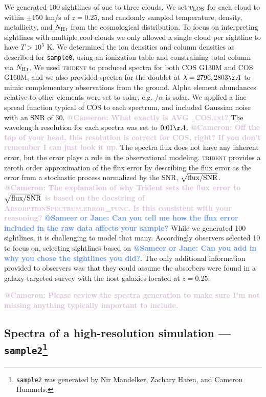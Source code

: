 \documentclass[fleqn,usenatbib]{mnras}
\makeatletter
\newcommand{\atsameer}[1]{\textcolor{CornflowerBlue}{\textbf{@Sameer or Jane: #1}}}
\newcommand{\atcameron}[1]{\textcolor{Thistle}{\textbf{@Cameron: #1}}}
\makeatother
\begin{document}
We generated 100 sightlines of one to three clouds.
We set $v_{\rm LOS}$ for each cloud to within $\pm150$ km/s of $z=0.25$, and randomly sampled temperature, density, metallicity, and $N_{\ion{H}{I}}$ from the cosmological distribution.
To focus on interpreting sightlines with multiple cool clouds we only allowed a single cloud per sightline to have $T>10^5$ K.
We determined the ion densities and column densities as described for \texttt{sample0}, using an ionization table and constraining total column via $N_{\ion{H}{I}}$.
We used \textsc{trident} to produced spectra for both COS G130M and COS G160M, and we also provided spectra for the  doublet at $\lambda = 2796, 2803 \AA$ to mimic complementary observations from the ground.
Alpha element abundances relative to other elements were set to solar, e.g. /$\alpha$ is solar.
We applied a line spread function typical of COS to each spectrum, and included Gaussian noise with an SNR of 30.
\atcameron{What exactly is AVG\_COS.txt?}
The wavelength resolution for each spectra was set to $0.01 \AA$.
\atcameron{Off the top of your head, this resolution is correct for COS, right?
If you don't remember I can just look it up.}
The spectra flux does not have any inherent error, but the error plays a role in the observational modeling.
\textsc{trident} provides a zeroth order approximation of the flux error by describing the flux error as the error from a stochastic process normalized by the SNR, $\sqrt{{\rm flux}/{\rm SNR}}$.
\atcameron{The explanation of why Trident sets the flux error to $\sqrt{{\rm flux}/{\rm SNR}}$ is based on the docstring of \textsc{AbsorptionSpectrum.error\_func}.
Is this consistent with your reasoning?}
\atsameer{Can you tell me how the flux error included in the raw data affects your sample?}
While we generated 100 sightlines, it is challenging to model that many.
Accordingly observers selected 10 to focus on, selecting sightlines based on \atsameer{Can you add in why you chose the sightlines you did?}.
The only additional information provided to observers was that they could assume the absorbers were found in a galaxy-targeted survey with the host galaxies located at $z=0.25$.

\atcameron{Please review the spectra generation to make sure I'm not missing anything typically important to include.}

\subsection[Spectra of a high-resolution simulation --- \texttt{sample2}]{Spectra of a high-resolution simulation --- \texttt{sample2}\footnote{
\texttt{sample2} was generated by Nir Mandelker, Zachary Hafen, and Cameron Hummels.}}
\label{s: data generation -- sample2}
\end{document}
